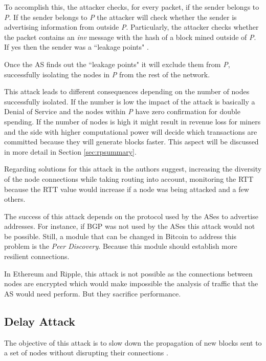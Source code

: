 To accomplish this, the attacker checks, for every packet, if the sender belongs to \textit{P}. If the sender belongs to \textit{P} the attacker will check whether the sender is advertising information from outside \textit{P}. Particularly, the attacker checks whether the packet contains an \textit{inv} message with the hash of a block mined outside of \textit{P}. If yes then the sender was a ``leakage points"  \cite{apostolaki2016hijacking}.

Once the AS finds out the ``leakage points" it will exclude them from \textit{P}, successfully isolating the nodes in \textit{P} from the rest of the network.

This attack leads to different consequences depending on the number of nodes successfully isolated. If the number is low the impact of the attack is basically a Denial of Service and the nodes within \textit{P} have zero confirmation for double spending. If the number of nodes is high it might result in revenue loss for miners and the side with higher computational power will decide which transactions are committed because they will generate blocks faster. This aspect will be discussed in more detail in Section \ref{sec:rpsummary}.

Regarding solutions for this attack in \cite{apostolaki2016hijacking} the authors suggest, increasing the diversity of the node connections while taking routing into account, monitoring the RTT because the RTT value would increase if a node was being attacked and a few others. 

The success of this attack depends on the protocol used by the ASes to advertise addresses. For instance, if BGP was not used by the ASes this attack would not be possible. Still, a module that can be changed in Bitcoin to address this problem is the \textit{Peer Discovery}. Because this module should establish more resilient connections.

In Ethereum and Ripple, this attack is not possible as the connections between nodes are encrypted which would make impossible the analysis of traffic that the AS would need perform. But they sacrifice performance.

\subsection{Delay Attack}
The objective of this attack is to slow down the propagation of new blocks sent to a set of nodes without disrupting their connections \cite{apostolaki2016hijacking}.

